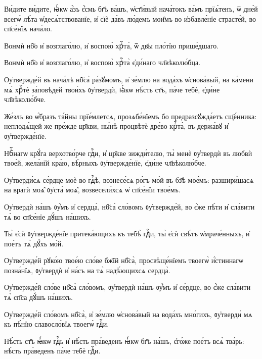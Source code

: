 \hKv Ви́дите ви́дите, ꙗ҆́кѡ  а҆́зъ є҆́смь бг҃ъ ва́шъ, ѡ҆ст҃и́вый нача́токъ ва́мъ  прїѧ́тенъ, ѿ дне́й всегѡ̀ лѣ́та ѡ҆десѧ́тствованїе, и҆  сїѐ да́въ лю́демъ мои̑мъ во и҆збавле́нїе страсте́й, во  сп҃се́нїѧ нача́ло. 
%

\hKv Вонмѝ нб҃о и҆ возглаго́лю, и҆ воспою̀ хрⷭ҇та̀, ѿ дв҃ы  пло́тїю прише́дшаго. 

\hKv Вонмѝ нб҃о и҆ возглаго́лю, и҆ воспою̀ хрⷭ҇та̀ є҆ди́наго  чл҃вѣколю́бца.  
%

\hKv Оу҆твержде́й въ нача́лѣ нб҃са̀ ра́зꙋмомъ, и҆ зе́млю на  вода́хъ ѡ҆снова́вый, на ка́мени мѧ̀ хрⷭ҇тѐ за́повѣдей  твои́хъ ᲂу҆твердѝ, ꙗ҆́кѡ нѣ́сть ст҃ъ, па́че тебѐ,  є҆ди́не чл҃вѣколю́бче. 
%

\hKv Же́злъ во ѡ҆́бразъ та́йны прїе́млетсѧ,  прозѧбе́нїемъ бо предразсꙋжда́етъ сщ҃е́нника: неплодѧ́щей же  пре́жде цр҃кви, ны́нѣ процвѣтѐ дре́во крⷭ҇та̀, въ  держа́вꙋ и҆ ᲂу҆твержде́нїе. 
%

\hKv Нбⷭ҇нагѡ крꙋ́га верхотво́рче гдⷭ҇и, и҆ цр҃кве зижди́телю,  ты̀ менѐ ᲂу҆твердѝ въ любвѝ твое́й, жела́нїй кра́ю,  вѣ́рныхъ ᲂу҆твержде́нїе, є҆ди́не чл҃вѣколю́бче. 
%

\hKv Оу҆тверди́сѧ се́рдце  моѐ во гдⷭ҇ѣ, вознесе́сѧ ро́гъ мо́й въ бз҃ѣ мое́мъ:  разшири́шасѧ на врагѝ моѧ̑ ᲂу҆ста̀ моѧ̑, возвесели́хсѧ ѡ҆  сп҃се́нїи твое́мъ.  

\hKv Оу҆твердѝ на́шъ ᲂу҆́мъ и҆ сердца̀, нб҃са̀ сло́вомъ  ᲂу҆твержде́й, во є҆́же пѣ́ти и҆ сла́вити тѧ̀ во сп҃се́нїе  дꙋ́шъ на́шихъ. 

\hKv Ты̀ є҆сѝ ᲂу҆твержде́нїе притека́ющихъ къ тебѣ̀ гдⷭ҇и,  ты̀ є҆сѝ свѣ́тъ ѡ҆мраче́нныхъ, и҆ пое́тъ тѧ̀ дꙋ́хъ мо́й. 

\hKv Оу҆твержде́й рꙋко́ю твое́ю сло́ве бж҃їй нб҃са̀,  просвѣще́нїемъ твоегѡ̀ и҆́стиннагѡ позна́нїѧ, ᲂу҆твердѝ  и҆ на́съ на тѧ̀ надѣ́ющихсѧ сердца̀. 

\hKv Оу҆твержде́й сло́ве нб҃са̀ сло́вомъ, ᲂу҆твердѝ на́шъ  ᲂу҆́мъ и҆ се́рдце, во є҆́же сла́вити тѧ̀ сп҃са дꙋ́шъ  на́шихъ. 

\hKv Оу҆твержде́й сло́вомъ нб҃са̀, и҆ зе́млю ѡ҆снова́вый на  вода́хъ мно́гихъ, ᲂу҆тверди́ мѧ къ пѣ́нїю славосло́вїѧ  твоегѡ̀ гдⷭ҇и. 

\hKv Нѣ́сть ст҃ъ ꙗ҆́кѡ гдⷭ҇ь и҆ нѣ́сть пра́веденъ ꙗ҆́кѡ бг҃ъ  на́шъ, є҆го́же пое́тъ всѧ̀ тва́рь: нѣ́сть пра́веденъ па́че  тебѐ гдⷭ҇и. 


